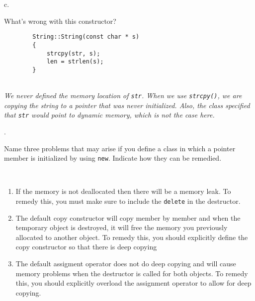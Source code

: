 \documentclass{amsart}
\begin{document}
\phantom{1. }c.
\begin{minipage}[t]{11.5 cm}
	What's wrong with this constructor?
	\begin{verbatim}
		String::String(const char * s)
		{
		    strcpy(str, s);
		    len = strlen(s);
		}
	\end{verbatim}
	\\[1ex]
	{\slshape 
		We never defined the memory location of \verb+str+. 
		When we use \verb+strcpy()+, we are copying the string
		to a pointer that was never initialized.
		Also, the class specified that \verb+str+ would point to
		dynamic memory, which is not the case here.
	} \\
	{} %
\end{minipage}
\vfill
\newpage

\phantom{\quad}
\vfill
{}. 
\begin{minipage}[t]{11.5 cm}
	Name three problems that may arise if you define a class in which a pointer member is initialized by using \texttt{new}. Indicate how they can be remedied. 
\end{minipage} \\[1ex]
\phantom{2. } 
\begin{minipage}[t]{11.5 cm}
	{\slshape 
		\begin{enumerate}
			\item If the memory is not deallocated then there will be
			a memory leak.
			To remedy this, you must make sure to include the 
			\verb+delete+ in the destructor.
			\item The default copy constructor will copy member by member
			and when the temporary object is destroyed, it will free 
			the memory you previously allocated to another object.
			To remedy this, you should explicitly define the copy constructor
			so that there is deep copying
			\item The default assigment operator does not do deep copying
			and will cause memory problems when the destructor is called
			for both objects. 
			To remedy this, you should explicitly overload 
			the assignment operator to allow for deep copying.
		\end{enumerate}
	} 
\end{minipage} 
\vfill
\end{document}
